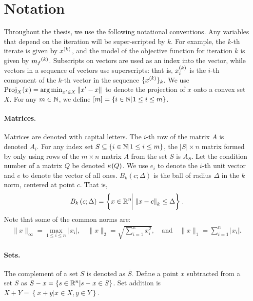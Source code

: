 \vspace{1cm}
\section{Notation}
Throughout the thesis, we use the following notational conventions.
Any variables that depend on the iteration will be super-scripted by $k$.
For example, the $k$-th iterate is given by $x^{(k)}$,
and the model of the objective function for iteration $k$ is given by ${{m}_f}^{(k)}$.
Subscripts on vectors are used as an index into the vector, while vectors in a sequence of vectors use superscripts:
that is, $x_i^{(k)}$ is the $i$-th component of the $k$-th vector in the sequence $\{x^{(k)}\}_k$.
We use ${\textrm{Proj}}_X(x) = \operatorname*{arg\,min}_{x' \in X}\left\|x' - x\right\|$ to denote the projection of $x$ onto a convex set $X$.
For any $m \in \mathbb N$, we define $[m] = \left\{i \in \mathbb N | 1 \le i \le m\right\}$.

\paragraph*{Matrices.}
Matrices are denoted with capital letters.
The $i$-th row of the matrix $A$ is denoted $A_i$.
For any index set $S \subseteq \{i \in \mathbb N | 1 \le i \le m\}$, the $|S| \times n$ matrix formed by only using
rows of the $m\times n$ matrix $A$ from the set $S$ is $A_S$.
Let the condition number of a matrix $Q$ be denoted ${\kappa}(Q)$.
We use $e_i$ to denote the $i$-th unit vector and $e$ to denote the vector of all ones.
$B_k\left(c; \Delta\right)$ is the ball of radius $\Delta$ in the $k$ norm, centered at point $c$.  That is,
\begin{align}
\label{define_ball}
B_k\left(c; \Delta\right) = \left\{x \in \mathbb R^n \bigg | \left\|x - c\right\|_k \le \Delta \right\}.
\end{align}
Note that some of the common norms are:
\begin{align*}
\|x\|_{\infty} = \max_{1\le i\le n}|x_i|, \quad
\|x\|_{2} = \sqrt{\sum_{i=1}^n x_i^2}, \quad \textrm{and} \quad
\|x\|_1 = \sum_{i = 1}^n |x_i|.
\end{align*}

\paragraph*{Sets.}
The complement of a set $S$ is denoted as $\bar S$.
Define a point $x$ subtracted from a set $S$ as $S - x = \left\{s \in \mathbb R^n | s - x \in S\right\}$.
Set addition is $X + Y = \left\{x + y | x \in X, y \in Y\right\}$.

